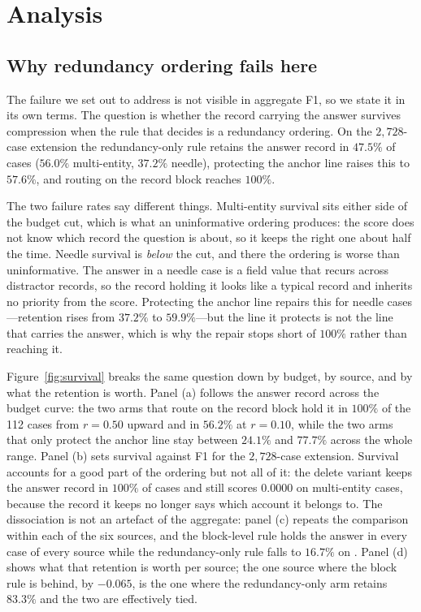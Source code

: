 \section{Analysis}
\label{sec:analysis}



\subsection{Why redundancy ordering fails here}

The failure we set out to address is not visible in aggregate F1, so we state it in its own
terms. The question is whether the record carrying the answer survives compression when the
rule that decides is a redundancy ordering. On the $2{,}728$-case extension the redundancy-only
rule retains the answer record in $47.5\%$ of cases ($56.0\%$ multi-entity, $37.2\%$ needle),
protecting the anchor line raises this to $57.6\%$, and routing on the record block reaches
$100\%$.

The two failure rates say different things. Multi-entity survival sits either side of the
budget cut, which is what an uninformative ordering produces: the score does not know which
record the question is about, so it keeps the right one about half the time. Needle survival
is \emph{below} the cut, and there the ordering is worse than uninformative. The answer in a
needle case is a field value that recurs across distractor records, so the record holding it
looks like a typical record and inherits no priority from the score. Protecting the anchor
line repairs this for needle cases---retention rises from $37.2\%$ to $59.9\%$---but the line
it protects is not the line that carries the answer, which is why the repair stops short of
$100\%$ rather than reaching it.

Figure~\ref{fig:survival} breaks the same question down by budget, by source, and by what the
retention is worth. Panel (a) follows the answer record across the budget curve: the two arms
that route on the record block hold it in $100\%$ of the 112 cases from $r=0.50$ upward and in
$56.2\%$ at $r=0.10$, while the two arms that only protect the anchor line stay between
$24.1\%$ and $77.7\%$ across the whole range. Panel (b) sets survival against F1 for the
$2{,}728$-case extension. Survival accounts for a good part of the ordering but not all of it:
the delete variant keeps the answer record in $100\%$ of cases and still scores $0.0000$ on
multi-entity cases, because the record it keeps no longer says which account it belongs to. The
dissociation is not an artefact of the aggregate: panel (c) repeats the comparison within each
of the six sources, and the block-level rule holds the answer in every case of every source
while the redundancy-only rule falls to $16.7\%$ on . Panel (d) shows what
that retention is worth per source; the one source where the block rule is behind, by
$-0.065$, is the one where the redundancy-only arm retains $83.3\%$ and the two are
effectively tied.

